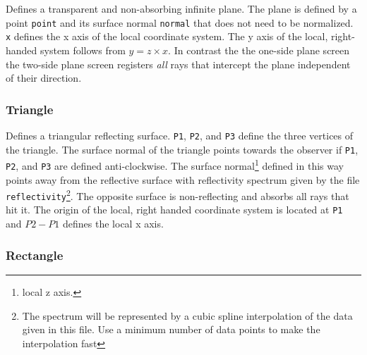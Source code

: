 \documentclass[10pt,a4paper,titlepage]{article}
\begin{document}




Defines a transparent and non-absorbing infinite plane. The plane is defined by a point {\tt point} and its surface normal {\tt normal} that does not need to be normalized. {\tt x} defines the x axis of the local coordinate system. The y axis of the local, right-handed system follows from $y=z \times x$. In contrast the the one-side plane screen the two-side plane screen registers \emph{all} rays that intercept the plane independent of their direction.


\subsubsection{Triangle}







Defines a triangular reflecting surface. {\tt P1}, {\tt P2}, and {\tt P3} define the three vertices of the triangle. The surface normal of the triangle points towards the observer if {\tt P1}, {\tt P2}, and {\tt P3} are defined anti-clockwise. The surface normal\footnote{local z axis.} defined in this way points away from the reflective surface with reflectivity spectrum given by the file {\tt reflectivity}\footnote{The spectrum will be represented by a cubic spline interpolation of the data given in this file. Use a minimum number of data points to make the interpolation fast}. The opposite surface is non-reflecting and absorbs all rays that hit it. The origin of the local, right handed coordinate system is located at {\tt P1} and $P2 - P1$ defines the local x axis. 


\subsubsection{Rectangle}

\end{document}

